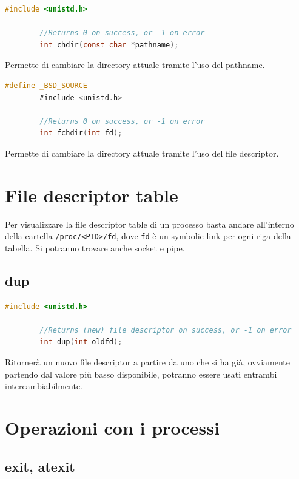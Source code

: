 \documentclass[a4paper, 12pt]{book}
\begin{document}
    \begin{lstlisting}[language=C]
        #include <unistd.h>

        //Returns 0 on success, or -1 on error
        int chdir(const char *pathname);
    \end{lstlisting} 
    Permette di cambiare la directory attuale tramite 
    l'uso del pathname.

    \begin{lstlisting}[language=C]
        #define _BSD_SOURCE
        #include <unistd.h>

        //Returns 0 on success, or -1 on error
        int fchdir(int fd);
    \end{lstlisting} 
    Permette di cambiare la directory attuale tramite 
    l'uso del file descriptor.

    \section{File descriptor table}

    Per visualizzare la file descriptor table di un processo
    basta andare all'interno della cartella 
    \verb|/proc/<PID>/fd|, dove \verb|fd| è un symbolic 
    link per ogni riga della tabella. Si potranno trovare 
    anche socket e pipe.
    
    \subsection{dup}

    \begin{lstlisting}[language=C]
        #include <unistd.h>

        //Returns (new) file descriptor on success, or -1 on error
        int dup(int oldfd);
    \end{lstlisting} 
    Ritornerà un nuovo file descriptor a partire da uno 
    che si ha già, ovviamente partendo dal valore più basso
    disponibile, potranno essere usati entrambi intercambiabilmente.

    \section{Operazioni con i processi}

    \subsection{exit, atexit}
\end{document}
